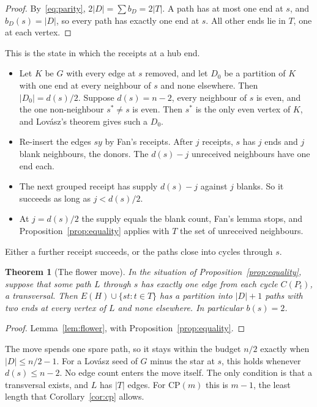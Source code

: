 \documentclass[11pt]{amsart}
\newtheorem{theorem}{Theorem}
\theoremstyle{definition}
\begin{document}
\begin{proof}
By~\eqref{eq:parity}, $2|D|=\sum b_D=2|T|$. A path has at most one end at $s$, and $b_D(s)=|D|$, so
every path has exactly one end at $s$. All other ends lie in $T$, one at each vertex.
\end{proof}

This is the state in which the receipts at a hub end.
\begin{itemize}
\item Let $K$ be $G$ with every edge at $s$ removed, and let $D_0$ be a partition of $K$ with one
end at every neighbour of $s$ and none elsewhere. Then $|D_0|=d(s)/2$. Suppose $d(s)=n-2$, every
neighbour of $s$ is even, and the one non-neighbour $s^*\ne s$ is even. Then $s^*$ is the only even
vertex of $K$, and Lov\'asz's theorem gives such a $D_0$.
\item Re-insert the edges $sy$ by Fan's receipts. After $j$ receipts, $s$ has $j$ ends and $j$ blank
neighbours, the donors. The $d(s)-j$ unreceived neighbours have one end each.
\item The next grouped receipt has supply $d(s)-j$ against $j$ blanks. So it succeeds as long as
$j<d(s)/2$.
\item At $j=d(s)/2$ the supply equals the blank count, Fan's lemma stops, and
Proposition~\ref{prop:equality} applies with $T$ the set of unreceived neighbours.
\end{itemize}
Either a further receipt succeeds, or the paths close into cycles through $s$.

\begin{theorem}[The flower move]\label{thm:flowermove}
In the situation of Proposition~\ref{prop:equality}, suppose that some path $L$ through $s$ has
exactly one edge from each cycle $C(P_t)$, a \emph{transversal}. Then $E(H)\cup\{st:t\in T\}$ has a
partition into $|D|+1$ paths with two ends at every vertex of $L$ and none elsewhere. In
particular $b(s)=2$.
\end{theorem}

\begin{proof}
Lemma~\ref{lem:flower}, with Proposition~\ref{prop:equality}.
\end{proof}

The move spends one spare path, so it stays within the budget $n/2$ exactly when $|D|\le n/2-1$.
For a Lov\'asz seed of $G$ minus the star at $s$, this holds whenever $d(s)\le n-2$. No edge count
enters the move itself. The only condition is that a transversal exists, and $L$ has $|T|$ edges.
For $\mathrm{CP}(m)$ this is $m-1$, the least length that Corollary~\ref{cor:cp} allows.
\end{document}
